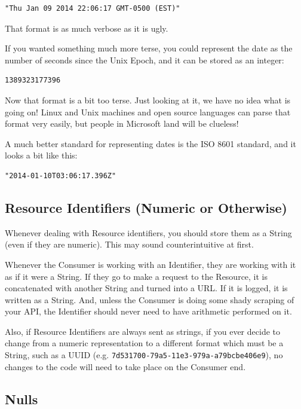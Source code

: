 \documentclass{book}
\begin{document}
\begin{verbatim}
"Thu Jan 09 2014 22:06:17 GMT-0500 (EST)"
\end{verbatim}

That format is as much verbose as it is ugly.

If you wanted something much more terse, you could represent the date as the number of seconds since the Unix Epoch, and it can be stored as an integer:

\begin{verbatim}
1389323177396
\end{verbatim}

Now that format is a bit too terse. Just looking at it, we have no idea what is going on! Linux and Unix machines and open source languages can parse that format very easily, but people in Microsoft land will be clueless!

A much better standard for representing dates is the ISO 8601 standard, and it looks a bit like this:

\begin{verbatim}
"2014-01-10T03:06:17.396Z"
\end{verbatim}

\subsection{Resource Identifiers (Numeric or Otherwise)}

Whenever dealing with Resource identifiers, you should store them as a String (even if they are numeric). This may sound counterintuitive at first.

Whenever the Consumer is working with an Identifier, they are working with it as if it were a String. If they go to make a request to the Resource, it is concatenated with another String and turned into a URL. If it is logged, it is written as a String. And, unless the Consumer is doing some shady scraping of your API, the Identifier should never need to have arithmetic performed on it.

Also, if Resource Identifiers are always sent as strings, if you ever decide to change from a numeric representation to a different format which must be a String, such as a UUID (e.g. \texttt{7d531700-79a5-11e3-979a-a79bcbe406e9}), no changes to the code will need to take place on the Consumer end.

\subsection{Nulls}
\end{document}
